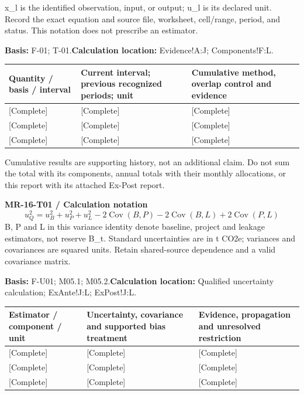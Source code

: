 x\_l is the identified observation, input, or output; u\_l is its declared unit. Record the exact equation and source file, worksheet, cell/range, period, and status. This notation does not prescribe an estimator.\par
\textbf{Basis:} F-01; T-01.\quad\textbf{Calculation location:} Evidence!A:J; Components!F:L.\par\endgroup
{\sffamily\fontsize{8.6}{10.7}\selectfont\begin{longtable}{@{}P{48mm}P{61mm}P{53mm}@{}}
\toprule
\textbf{Quantity / basis / interval} & \textbf{Current interval; previous recognized periods; unit} & \textbf{Cumulative method, overlap control and evidence}\\\midrule\endhead
\rule{0pt}{8mm}[Complete] & [Complete] & [Complete]\\\hline
\rule{0pt}{8mm}[Complete] & [Complete] & [Complete]\\\hline
\rule{0pt}{8mm}[Complete] & [Complete] & [Complete]\\\hline
\end{longtable}}
Cumulative results are supporting history, not an additional claim. Do not sum the total with its components, annual totals with their monthly allocations, or this report with its attached Ex-Post report.\par
{}
\par\begingroup\sffamily\fontsize{8.4}{10.5}\selectfont\color{NEBGreen}
\textbf{MR-16-T01 / Calculation notation}\
{\fontsize{10}{12}\selectfont\[u_Q^2=u_B^2+u_P^2+u_L^2-2\operatorname{Cov}(B,P)-2\operatorname{Cov}(B,L)+2\operatorname{Cov}(P,L)\]}
B, P and L in this variance identity denote baseline, project and leakage estimators, not reserve B\_t. Standard uncertainties are in t CO2e; variances and covariances are squared units. Retain shared-source dependence and a valid covariance matrix.\par
\textbf{Basis:} F-U01; M05.1; M05.2.\quad\textbf{Calculation location:} Qualified uncertainty calculation; ExAnte!J:L; ExPost!J:L.\par\endgroup
{\sffamily\fontsize{8.6}{10.7}\selectfont\begin{longtable}{@{}P{48mm}P{61mm}P{53mm}@{}}
\toprule
\textbf{Estimator / component / unit} & \textbf{Uncertainty, covariance and supported bias treatment} & \textbf{Evidence, propagation and unresolved restriction}\\\midrule\endhead
\rule{0pt}{8mm}[Complete] & [Complete] & [Complete]\\\hline
\rule{0pt}{8mm}[Complete] & [Complete] & [Complete]\\\hline
\rule{0pt}{8mm}[Complete] & [Complete] & [Complete]\\\hline
\end{longtable}}
